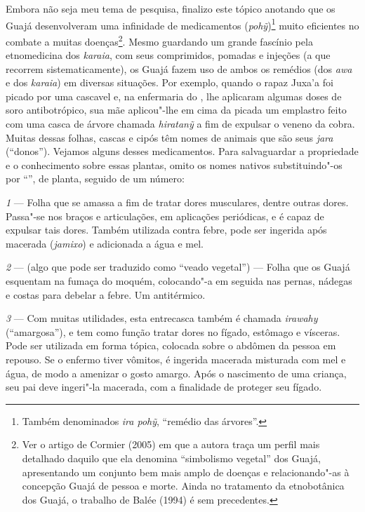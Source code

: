 Embora não seja meu tema de pesquisa, finalizo este tópico anotando que
os Guajá desenvolveram uma infinidade de medicamentos
(\emph{pohỹ})\footnote{Também denominados \emph{ira pohỹ}, ``remédio das
  árvores''.} muito eficientes no combate a muitas doenças\footnote{Ver o
  artigo de Cormier (2005) em que a autora traça um perfil mais
  detalhado daquilo que ela denomina ``simbolismo vegetal'' dos Guajá,
  apresentando um conjunto bem mais amplo de doenças e relacionando"-as à
  concepção Guajá de pessoa e morte. Ainda no tratamento da etnobotânica
  dos Guajá, o trabalho de Balée (1994) é sem precedentes.}. Mesmo
guardando um grande fascínio pela etnomedicina dos \emph{karaia}, com
seus comprimidos, pomadas e injeções (a que recorrem sistematicamente),
os Guajá fazem uso de ambos os remédios (dos \emph{awa} e dos
\emph{karaia}) em diversas situações. Por exemplo, quando o rapaz Juxa'a
foi picado por uma cascavel e, na enfermaria do , lhe aplicaram
algumas doses de soro antibotrópico, sua mãe aplicou"-lhe em cima da
picada um emplastro feito com uma casca de árvore chamada
\emph{hiratanỹ} a fim de expulsar o veneno da cobra. Muitas dessas
folhas, cascas e cipós têm nomes de animais que são seus \emph{jara}
(``donos''). Vejamos alguns desses medicamentos. Para salvaguardar a
propriedade e o conhecimento sobre essas plantas, omito os nomes nativos
substituindo"-os por ``'', de planta, seguido de um número:

\emph{1} --- Folha que se amassa a fim de tratar dores
musculares, dentre outras dores. Passa"-se nos braços e articulações, em
aplicações periódicas, e é capaz de expulsar tais dores. Também
utilizada contra febre, pode ser ingerida após macerada (\emph{jamixo})
e adicionada a água e mel.

\emph{2} --- (algo que pode ser traduzido como ``veado vegetal'')
--- Folha que os Guajá esquentam na fumaça do moquém, colocando"-a em
seguida nas pernas, nádegas e costas para debelar a febre. Um
antitérmico.

\emph{3} --- Com muitas utilidades, esta entrecasca também é
chamada \emph{irawahy} (``amargosa''), e tem como função tratar dores no
fígado, estômago e vísceras. Pode ser utilizada em forma tópica,
colocada sobre o abdômen da pessoa em repouso. Se o enfermo tiver
vômitos, é ingerida macerada misturada com mel e água, de modo a
amenizar o gosto amargo. Após o nascimento de uma criança, seu pai deve
ingeri"-la macerada, com a finalidade de proteger seu fígado.

